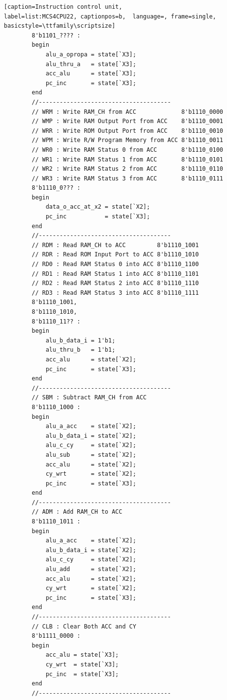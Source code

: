 \begin{enumerate}[(1)]
\begin{lstlisting}[caption=Instruction control unit, 
label=list:MCS4CPU22, captionpos=b,  language=, frame=single, basicstyle=\ttfamily\scriptsize]
        8'b1101_???? :
        begin
            alu_a_opropa = state[`X3];
            alu_thru_a   = state[`X3];
            acc_alu      = state[`X3];
            pc_inc       = state[`X3];
        end
        //--------------------------------------
        // WRM : Write RAM_CH from ACC             8'b1110_0000
        // WMP : Write RAM Output Port from ACC    8'b1110_0001
        // WRR : Write ROM Output Port from ACC    8'b1110_0010
        // WPM : Write R/W Program Memory from ACC 8'b1110_0011
        // WR0 : Write RAM Status 0 from ACC       8'b1110_0100
        // WR1 : Write RAM Status 1 from ACC       8'b1110_0101
        // WR2 : Write RAM Status 2 from ACC       8'b1110_0110
        // WR3 : Write RAM Status 3 from ACC       8'b1110_0111
        8'b1110_0??? :
        begin
            data_o_acc_at_x2 = state[`X2];
            pc_inc           = state[`X3];
        end
        //--------------------------------------
        // RDM : Read RAM_CH to ACC         8'b1110_1001
        // RDR : Read ROM Input Port to ACC 8'b1110_1010
        // RD0 : Read RAM Status 0 into ACC 8'b1110_1100
        // RD1 : Read RAM Status 1 into ACC 8'b1110_1101
        // RD2 : Read RAM Status 2 into ACC 8'b1110_1110
        // RD3 : Read RAM Status 3 into ACC 8'b1110_1111
        8'b1110_1001,
        8'b1110_1010,
        8'b1110_11?? :
        begin
            alu_b_data_i = 1'b1;
            alu_thru_b   = 1'b1;
            acc_alu      = state[`X2];
            pc_inc       = state[`X3];
        end
        //--------------------------------------
        // SBM : Subtract RAM_CH from ACC
        8'b1110_1000 :
        begin
            alu_a_acc    = state[`X2];
            alu_b_data_i = state[`X2];
            alu_c_cy     = state[`X2];
            alu_sub      = state[`X2];
            acc_alu      = state[`X2];
            cy_wrt       = state[`X2];
            pc_inc       = state[`X3];
        end
        //--------------------------------------
        // ADM : Add RAM_CH to ACC
        8'b1110_1011 :
        begin
            alu_a_acc    = state[`X2];
            alu_b_data_i = state[`X2];
            alu_c_cy     = state[`X2];
            alu_add      = state[`X2];
            acc_alu      = state[`X2];
            cy_wrt       = state[`X2];
            pc_inc       = state[`X3];
        end
        //--------------------------------------
        // CLB : Clear Both ACC and CY
        8'b1111_0000 :
        begin
            acc_alu = state[`X3];
            cy_wrt  = state[`X3];
            pc_inc  = state[`X3];
        end
        //--------------------------------------

\end{lstlisting}
\end{enumerate}
